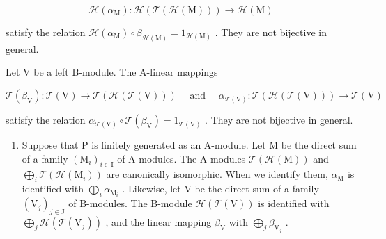 \[
\mathcal {H} (\alpha_ {\mathrm{M}}): \mathcal {H} (\mathcal {T} (\mathcal {H} (\mathrm{M}))) \to \mathcal {H} (\mathrm{M})
\]

satisfy the relation \(\mathcal{H}(\alpha_{\mathrm{M}})\circ\beta_{\mathcal{H}(\mathrm{M})}=1_{\mathcal{H}(\mathrm{M})}\) . They are not bijective in general.

Let V be a left B-module. The A-linear mappings

\[
\mathcal {T} (\beta_ {\mathrm{V}}): \mathcal {T} (\mathrm{V}) \to \mathcal {T} (\mathcal {H} (\mathcal {T} (\mathrm{V}))) \quad \text { and } \quad \alpha_ {\mathcal {T} (\mathrm{V})}: \mathcal {T} (\mathcal {H} (\mathcal {T} (\mathrm{V}))) \to \mathcal {T} (\mathrm{V})
\]

satisfy the relation \(\alpha_{\mathcal{T}(\mathrm{V})}\circ \mathcal{T}(\beta_{\mathrm{V}}) = 1_{\mathcal{T}(\mathrm{V})}\) . They are not bijective in general.

\begin{enumerate}
\def\labelenumi{\arabic{enumi})}
\setcounter{enumi}{2}
\tightlist
\item
  Suppose that P is finitely generated as an A-module. Let M be the direct sum of a family \((\mathrm{M}_{i})_{i\in\mathrm{I}}\) of A-modules. The A-modules \(\mathcal{T}(\mathcal{H}(\mathrm{M}))\) and \(\bigoplus_{i}\mathcal{T}(\mathcal{H}(\mathrm{M}_{i}))\) are canonically isomorphic. When we identify them, \(\alpha_{\mathrm{M}}\) is identified with \(\bigoplus_{i}\alpha_{\mathrm{M}_{i}}\) . Likewise, let V be the direct sum of a family \((\mathrm{V}_j)_{j\in \mathrm{J}}\) of B-modules. The B-module \(\mathcal{H}(\mathcal{T}(\mathrm{V}))\) is identified with \(\bigoplus_{j}\mathcal{H}(\mathcal{T}(\mathrm{V}_{j}))\) , and the linear mapping \(\beta_{\mathrm{V}}\) with \(\bigoplus_{j}\beta_{\mathrm{V}_{j}}\) .
\end{enumerate}

